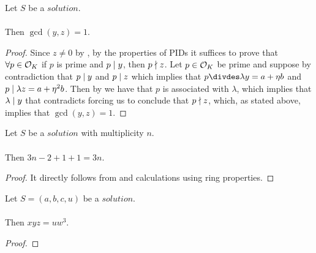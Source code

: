 \begin{lemma}
    \label{lmm:coprime_y_z}
    \leanok
    Let $S$ be a $solution$.\\\\
    Then $\gcd(y, z) = 1$.
\end{lemma}
\begin{proof}
    \leanok
    Since $z \neq 0$ by , by the properties of PIDs it suffices to prove that
    $\forall p \in \mathcal{O}_K$ if $p$ is prime and $p \mid y$, then $p \nmid z$.
    Let $p \in \mathcal{O}_K$ be prime and suppose by contradiction that $p \mid y$ and $p \mid z$
    which implies that $p \divdes \lambda y = a+\eta b$ and $p \mid \lambda z = a + \eta^2 b$.
    Then by 
    we have that $p$ is associated with $\lambda$, which implies that $\lambda \mid y$
    that contradicts  forcing us to conclude that $p \nmid z$, which,
    as stated above, implies that $\gcd(y,z)=1$.
\end{proof}

\begin{lemma}
    \label{lmm:mult_minus_two_plus_one_plus_one}
    \leanok
    Let $S$ be a $solution$ with multiplicity $n$.\\\\
    Then $3n - 2 + 1 + 1 = 3n$.
\end{lemma}
\begin{proof}
    \leanok
    It directly follows from 
    and calculations using ring properties.
\end{proof}

\begin{lemma}
    \label{lmm:x_mul_y_mul_z_eq_u_w_pow_three}
    \leanok
    Let $S=(a,b,c,u)$ be a $solution$.\\\\
    Then $x y z = u w^3$.
\end{lemma}
\begin{proof}
    \leanok
\end{proof}

